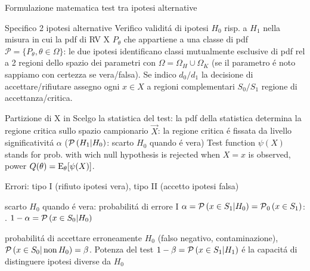 \documentclass[asd-beamer.tex]{subfiles}%
\begin{document}
\begin{frame}{Formulazione matematica test tra ipotesi alternative}\frameintoc
\begin{block}{Specifico 2 ipotesi alternative}
Verifico validit\'a di ipotesi $H_0$ risp. a $H_1$ nella misura in cui la pdf di RV X $P_{\theta}$ che appartiene a una classe di pdf $\mathcal{P}=\{P_{\theta}, \theta\in\Omega\}$: le due ipotesi identificano classi mutualmente esclusive di pdf rel a 2 regioni dello spazio dei parametri con $\Omega=\Omega_H\cup\Omega_K$ (se il parametro \'e noto sappiamo con certezza se vera/falsa). Se indico $d_0/d_1$ la decisione di accettare/rifiutare assegno ogni $x\in X$ a regioni complementari $S_0/S_1$ regione di accettanza/critica.
\end{block}
\begin{block}{Partizione di X in }
Scelgo la statistica del test: la pdf della statistica determina la regione critica sullo spazio campionario $\vec{X}$: la regione critica \'e fissata da livello significativit\'a $\alpha$ ($\operatorname{\mathcal{P}}{(H_1|H_0)}$: scarto $H_0$ quando \'e vera)
Test function $\psi(X)$ stands for prob. with wich null hypothesis is rejected when $X=x$ is observed, power $Q(\theta)=\operatorname{E}_{\theta}[\psi(X)]$.
\end{block}
\end{frame}

\begin{frame}{Errori: tipo I (rifiuto ipotesi vera), tipo II (accetto ipotesi falsa)}
\begin{block}{ }
	scarto $H_0$ quando \'e vera: probabilit\'a di errore I $\alpha=\operatorname{\mathcal{P}}{(x\in S_1|H_0)}=\operatorname{\mathcal{P}}_0{(x\in S_1)}$: .  $1-\alpha=\operatorname{\mathcal{P}}{(x\in S_0|H_0)}$
\end{block}
\begin{block}{}
	probabilit\'a di accettare erroneamente $H_0$ (falso negativo, contaminazione), $\operatorname{\mathcal{P}}{(x\in S_0|\operatorname{non}{H_0})}=\beta$. Potenza del test $1-\beta=\operatorname{\mathcal{P}}{(x\in S_1|H_1)}$ \'e la capacit\'a di distinguere ipotesi diverse da $H_0$ 
\end{block}
\end{frame}
\end{document}
